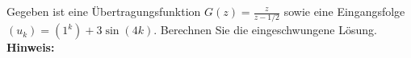 \begin{question}[section=6,name={Eingeschwungene Lösung 1},difficulty=,type=mdl,tags={}]
	Gegeben ist eine Übertragungsfunktion $G(z) = \frac{z}{z-1/2}$ sowie eine Eingangsfolge $(u_k) = (1^k) + 3 \sin(4k)$. Berechnen Sie die eingeschwungene Lösung.
	\\ \textbf{Hinweis:}\\
	
\end{question}
\begin{solution}
	
\end{solution}